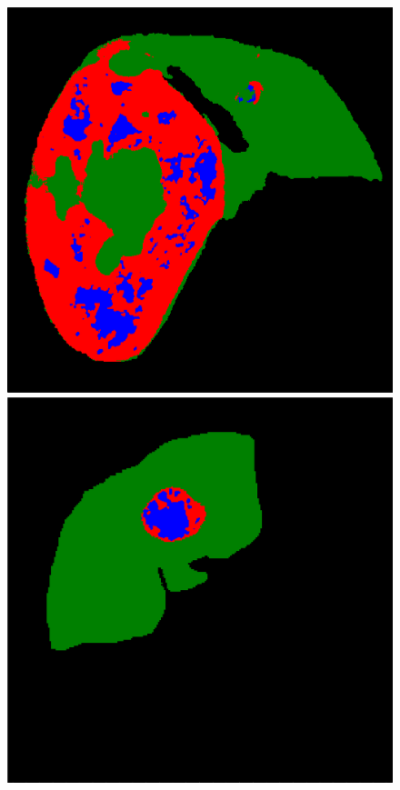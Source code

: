 \begin{figure}[!ht]
\begin{minipage}{4cm}
\end{minipage} \hspace{-0.3cm}
\begin{minipage}{4cm}
\includegraphics[width=\linewidth]{./images/5_8_FullDMP_resized}
\end{minipage} 
\vspace{-0.2cm}
\begin{minipage}{4cm}
\includegraphics[width=\linewidth]{./images/1_21_Cascade_resized}

\end{minipage}
\end{figure}
